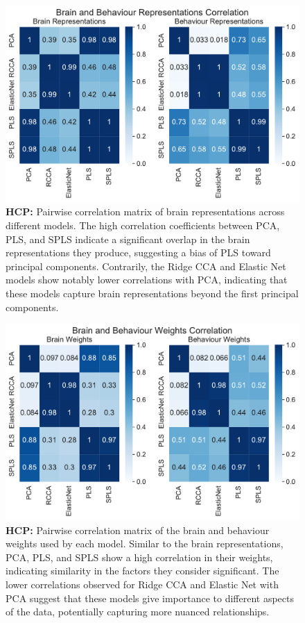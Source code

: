 \begin{figure}
    \centering
    \includegraphics[width=0.8\linewidth]{figures/hcp/brain and behaviour scores correlation}
    \caption{\textbf{HCP:} Pairwise correlation matrix of brain representations across different models. The high correlation coefficients between PCA, PLS, and SPLS indicate a significant overlap in the brain representations they produce, suggesting a bias of PLS toward principal components. Contrarily, the Ridge CCA and Elastic Net models show notably lower correlations with PCA, indicating that these models capture brain representations beyond the first principal components.}\label{fig:brain-behaviour-scores-sim}
\end{figure}

\begin{figure}
    \centering
    \includegraphics[width=0.8\linewidth]{figures/hcp/brain and behaviour weights correlation}
    \caption{\textbf{HCP:} Pairwise correlation matrix of the brain and behaviour weights used by each model. Similar to the brain representations, PCA, PLS, and SPLS show a high correlation in their weights, indicating similarity in the factors they consider significant. The lower correlations observed for Ridge CCA and Elastic Net with PCA suggest that these models give importance to different aspects of the data, potentially capturing more nuanced relationships.}\label{fig:brain-behaviour-weights-sim}
\end{figure}


